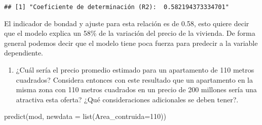 \documentclass[
]{article}
\newenvironment{Shaded}{\begin{snugshade}}{\end{snugshade}}
\newcommand{\AttributeTok}[1]{\textcolor[rgb]{0.77,0.63,0.00}{#1}}
\newcommand{\DecValTok}[1]{\textcolor[rgb]{0.00,0.00,0.81}{#1}}
\newcommand{\FunctionTok}[1]{\textcolor[rgb]{0.00,0.00,0.00}{#1}}
\newcommand{\NormalTok}[1]{#1}
\providecommand{\tightlist}{%
  \setlength{\itemsep}{0pt}\setlength{\parskip}{0pt}}
\begin{document}
\begin{verbatim}
## [1] "Coeficiente de determinación (R2):  0.582194373334701"
\end{verbatim}

El indicador de bondad y ajuste para esta relación es de 0.58, esto
quiere decir que el modelo explica un 58\% de la variación del precio de
la vivienda. De forma general podemos decir que el modelo tiene poca
fuerza para predecir a la variable dependiente.

\begin{enumerate}
\def\labelenumi{\arabic{enumi}.}
\setcounter{enumi}{5}
\tightlist
\item
  ¿Cuál sería el precio promedio estimado para un apartamento de 110
  metros cuadrados? Considera entonces con este resultado que un
  apartamento en la misma zona con 110 metros cuadrados en un precio de
  200 millones sería una atractiva esta oferta? ¿Qué consideraciones
  adicionales se deben tener?.
\end{enumerate}

\begin{Shaded}
\begin{Highlighting}[]
\FunctionTok{predict}\NormalTok{(mod, }\AttributeTok{newdata =} \FunctionTok{list}\NormalTok{(}\AttributeTok{Area\_contruida=}\DecValTok{110}\NormalTok{))}
\end{Highlighting}
\end{Shaded}
\end{document}
